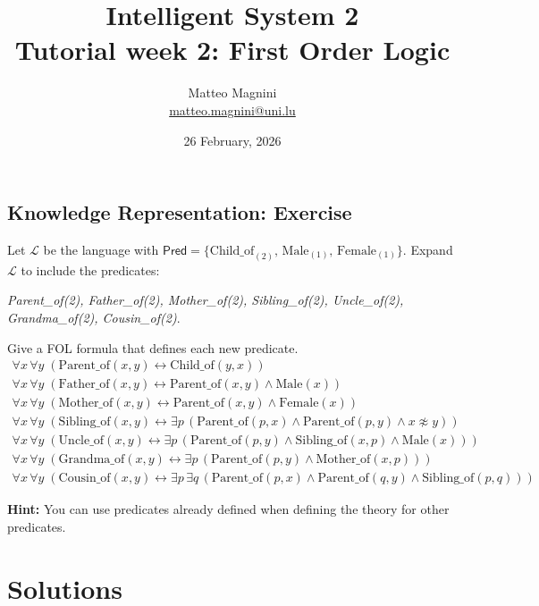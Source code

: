 \documentclass[11pt]{article}
\title{
    Intelligent System 2\\
    Tutorial week 2: First Order Logic
}
\author{
    Matteo Magnini\\
    \href{mailto:matteo.magnini@uni.lu}{matteo.magnini@uni.lu}
}
\date{
    26 February, 2026
}
\begin{document}
    \maketitle

    \subsection{Knowledge Representation: Exercise}
    \label{subsec:knowledge-representation:-exercise}

    Let $\mathcal{L}$ be the language with $\mathsf{Pred} = \{\text{Child\_of}_{(2)},\, \text{Male}_{(1)},\, \text{Female}_{(1)}\}$.
    Expand $\mathcal{L}$ to include the predicates:

    \textit{Parent\_of(2), Father\_of(2), Mother\_of(2), Sibling\_of(2), Uncle\_of(2), Grandma\_of(2), Cousin\_of(2)}.

    Give a \ac{FOL} formula that defines each new predicate.
    \[
    \begin{array}{ll}
    \forall x\, \forall y\;(\text{Parent\_of}(x, y) \leftrightarrow \text{Child\_of}(y, x)) \\
    \forall x\, \forall y\;(\text{Father\_of}(x, y) \leftrightarrow \text{Parent\_of}(x, y) \wedge \text{Male}(x)) \\
    \forall x\, \forall y\;(\text{Mother\_of}(x, y) \leftrightarrow \text{Parent\_of}(x, y) \wedge \text{Female}(x)) \\
    \forall x\, \forall y\;(\text{Sibling\_of}(x, y) \leftrightarrow \exists p\, (\text{Parent\_of}(p, x) \wedge \text{Parent\_of}(p, y) \wedge x \not\approx y)) \\
    \forall x\, \forall y\;(\text{Uncle\_of}(x, y) \leftrightarrow \exists p\, (\text{Parent\_of}(p, y) \wedge \text{Sibling\_of}(x, p) \wedge \text{Male}(x))) \\
    \forall x\, \forall y\;(\text{Grandma\_of}(x, y) \leftrightarrow \exists p\, (\text{Parent\_of}(p, y) \wedge \text{Mother\_of}(x, p))) \\
    \forall x\, \forall y\;(\text{Cousin\_of}(x, y) \leftrightarrow \exists p\, \exists q\, (\text{Parent\_of}(p, x) \wedge \text{Parent\_of}(q, y) \wedge \text{Sibling\_of}(p, q)))
    \end{array}
    \]

    \textbf{Hint:} You can use predicates already defined when defining the theory for other predicates.

    \section{Solutions}\label{sec:solutions}
\end{document}

